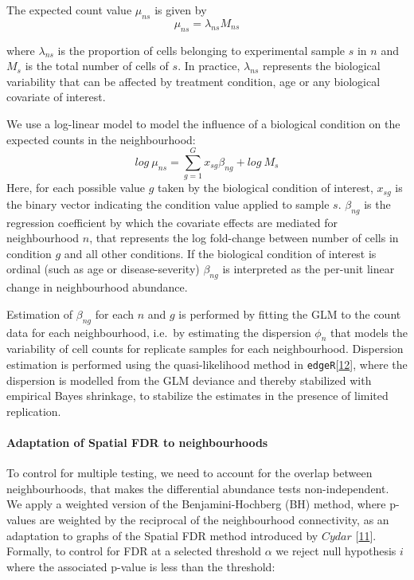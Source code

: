 \documentclass[
]{article}
\begin{document}
The expected count value \(\mu_{ns}\) is given by
\[
\mu_{ns} = \lambda_{ns}M_{ns}
\]

where \(\lambda_{ns}\) is the proportion of cells belonging to experimental sample \(s\) in \(n\) and \(M_s\) is the total number of cells of \(s\). In practice, \(\lambda_{ns}\) represents the biological variability that can be affected by treatment condition, age or any biological covariate of interest.

We use a log-linear model to model the influence of a biological condition on the expected counts in the neighbourhood:
\[
log\ \mu_{ns} = \sum_{g=1}^{G}x_{sg}\beta_{ng} + log\ M_s
\]
Here, for each possible value \(g\) taken by the biological condition of interest, \(x_{sg}\) is the binary vector indicating the condition value applied to sample \(s\). \(\beta_{ng}\) is the regression coefficient by which the covariate effects are mediated for neighbourhood \(n\), that represents the log fold-change between number of cells in condition \(g\) and all other conditions. If the biological condition of interest is ordinal (such as age or disease-severity) \(\beta_{ng}\) is interpreted as the per-unit linear change in neighbourhood abundance.

Estimation of \(\beta_{ng}\) for each \(n\) and \(g\) is performed by fitting the GLM to the count data for each neighbourhood, i.e.~by estimating the dispersion \(\phi_{n}\) that models the variability of cell counts for replicate samples for each neighbourhood. Dispersion estimation is performed using the quasi-likelihood method in \texttt{edgeR}{[}\protect\hyperlink{ref-robinsonEdgeRBioconductorPackage2010a}{12}{]}, where the dispersion is modelled from the GLM deviance and thereby stabilized with empirical Bayes shrinkage, to stabilize the estimates in the presence of limited replication.

\hypertarget{adaptation-of-spatial-fdr-to-neighbourhoods}{%
\paragraph*{Adaptation of Spatial FDR to neighbourhoods}\label{adaptation-of-spatial-fdr-to-neighbourhoods}}

To control for multiple testing, we need to account for the overlap between neighbourhoods, that makes the differential abundance tests non-independent. We apply a weighted version of the Benjamini-Hochberg (BH) method, where p-values are weighted by the reciprocal of the neighbourhood connectivity, as an adaptation to graphs of the Spatial FDR method introduced by \(Cydar\) {[}\protect\hyperlink{ref-lunTestingDifferentialAbundance2017}{11}{]}.
Formally, to control for FDR at a selected threshold \(\alpha\) we reject null hypothesis \(i\) where the associated p-value is less than the threshold:
\end{document}
